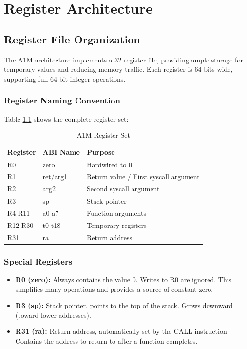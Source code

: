 \documentclass[12pt,a4paper,oneside]{book}
\begin{document}
\chapter{Register Architecture}

\section{Register File Organization}

The A1M architecture implements a 32-register file, providing ample storage for temporary values and reducing memory traffic. Each register is 64 bits wide, supporting full 64-bit integer operations.

\subsection{Register Naming Convention}

Table \ref{tab:registers} shows the complete register set:

\begin{table}[H]
\centering
\caption{A1M Register Set}
\label{tab:registers}
\begin{tabularx}{\textwidth}{|l|l|X|}
\hline
\textbf{Register} & \textbf{ABI Name} & \textbf{Purpose} \\
\hline
R0 & zero & Hardwired to 0 \\
R1 & ret/arg1 & Return value / First syscall argument \\
R2 & arg2 & Second syscall argument \\
R3 & sp & Stack pointer \\
R4-R11 & a0-a7 & Function arguments \\
R12-R30 & t0-t18 & Temporary registers \\
R31 & ra & Return address \\
\hline
\end{tabularx}
\end{table}

\subsection{Special Registers}

\begin{itemize}
    \item \textbf{R0 (zero):} Always contains the value 0. Writes to R0 are ignored. This simplifies many operations and provides a source of constant zero.
    \item \textbf{R3 (sp):} Stack pointer, points to the top of the stack. Grows downward (toward lower addresses).
    \item \textbf{R31 (ra):} Return address, automatically set by the CALL instruction. Contains the address to return to after a function completes.
\end{itemize}
\end{document}
